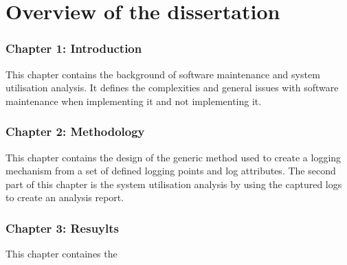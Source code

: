 \section{Overview of the dissertation}
\subsubsection{Chapter 1: Introduction}
This chapter contains the background of software maintenance and system utilisation analysis. It defines the complexities and general issues with software maintenance when implementing it and not implementing it.

\subsubsection{Chapter 2: Methodology}
This chapter contains the design of the generic method used to create a logging mechanism from a set of defined logging points and log attributes. The second part of this chapter is the system utilisation analysis by using the captured logs to create an analysis report.

\subsubsection{Chapter 3: Resuylts}
This chapter containes the 
